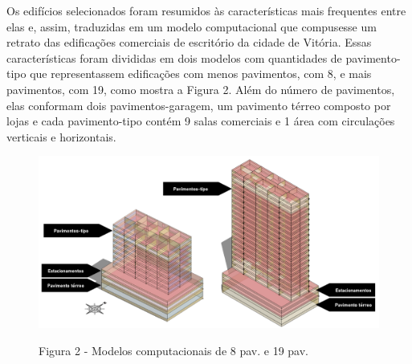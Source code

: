 \begin{onehalfspace}
    \noindent Os edifícios selecionados foram resumidos às características mais frequentes 
    entre elas e, assim, traduzidas em um modelo computacional que compusesse um retrato 
    das edificações comerciais de escritório da cidade de Vitória. Essas características 
    foram divididas em dois modelos com quantidades de pavimento-tipo que representassem 
    edificações com menos pavimentos, com 8, e mais pavimentos, com 19, como mostra a 
    Figura 2. Além do número de pavimentos, elas conformam dois pavimentos-garagem, 
    um pavimento térreo composto por lojas e cada pavimento-tipo contém 9 salas 
    comerciais e 1 área com circulações verticais e horizontais.\vspace*{0.3cm}
    \begin{figure}[H]
        \centering
        \includegraphics[width=1\textwidth]{figures/fig11_8-19-2pav.png}
        \begin{flushleft}
            \small Figura 2 - Modelos computacionais de 8 pav. e 19 pav.
        \end{flushleft}
    \end{figure}


\end{onehalfspace}
